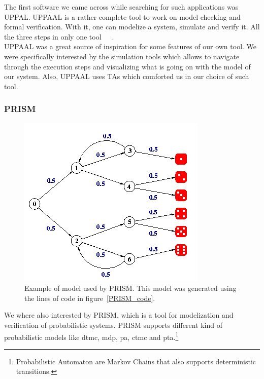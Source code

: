 \documentclass[12pt]{article}
\theoremstyle{definition}
\theoremstyle{definition}
\begin{document}
The first software we came across while searching for such applications was UPPAL. UPPAAL is a rather complete tool to work on model checking and formal verification. With it, one can modelize a system, simulate and verify it. All the three steps in only one tool~\cite{Bengtsson1996}~\cite{Behrmann2004}~\cite{Larsen1997}.\\

UPPAAL was a great source of inspiration for some features of our own tool. We were specifically interested by the simulation tools which allows to navigate through the execution steps and visualizing what is going on with the model of our system. Also, UPPAAL uses TAs which comforted us in our choice of such tool.\\

\subsubsection{PRISM}

\begin{figure}
    \centering
    \includegraphics[scale=0.6]{PRISM_model.png}
    \caption{Example of model used by PRISM. This model was generated using the lines of code in figure~\ref{PRISM_code}.}
    \label{PRISM_model}
\end{figure}

We where also interested by PRISM, which is a tool for modelization and verification of probabilistic systems. PRISM supports different kind of probabilistic models like \gls{dtmc}, \gls{mdp}, \gls{pa}, \gls{ctmc} and \gls{pta}.\footnote{Probabilistic Automaton are Markov Chains that also supports deterministic transitions.}~\cite{Kwiatkowska2011}~\cite{Hinton2006}\\
\end{document}
